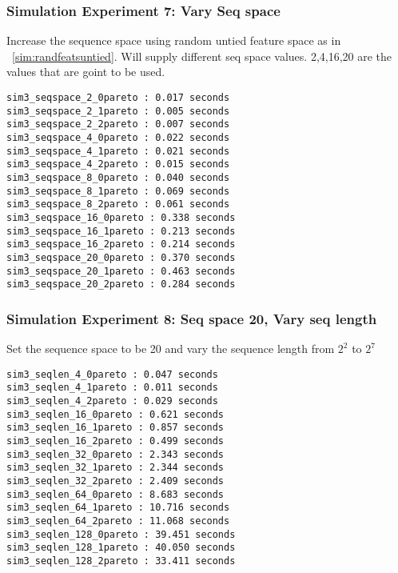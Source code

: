 \documentclass{article}
\begin{document}
\subsubsection{Simulation Experiment 7: Vary Seq space }
\label{sim:seqspace}
Increase the sequence space using random untied feature space as in ~\ref{sim:randfeatsuntied}. Will supply different seq space values. 2,4,16,20 are the values that are goint to be used.
\begin{verbatim}
sim3_seqspace_2_0pareto : 0.017 seconds
sim3_seqspace_2_1pareto : 0.005 seconds
sim3_seqspace_2_2pareto : 0.007 seconds
sim3_seqspace_4_0pareto : 0.022 seconds
sim3_seqspace_4_1pareto : 0.021 seconds
sim3_seqspace_4_2pareto : 0.015 seconds
sim3_seqspace_8_0pareto : 0.040 seconds
sim3_seqspace_8_1pareto : 0.069 seconds
sim3_seqspace_8_2pareto : 0.061 seconds
sim3_seqspace_16_0pareto : 0.338 seconds
sim3_seqspace_16_1pareto : 0.213 seconds
sim3_seqspace_16_2pareto : 0.214 seconds
sim3_seqspace_20_0pareto : 0.370 seconds
sim3_seqspace_20_1pareto : 0.463 seconds
sim3_seqspace_20_2pareto : 0.284 seconds
\end{verbatim}


\subsubsection{Simulation Experiment 8: Seq space 20, Vary seq length}
\label{sim:seqlen}
Set the sequence space to be 20 and vary the sequence length from $2^2$  to $2^7$
\begin{verbatim}
sim3_seqlen_4_0pareto : 0.047 seconds
sim3_seqlen_4_1pareto : 0.011 seconds
sim3_seqlen_4_2pareto : 0.029 seconds
sim3_seqlen_16_0pareto : 0.621 seconds
sim3_seqlen_16_1pareto : 0.857 seconds
sim3_seqlen_16_2pareto : 0.499 seconds
sim3_seqlen_32_0pareto : 2.343 seconds
sim3_seqlen_32_1pareto : 2.344 seconds
sim3_seqlen_32_2pareto : 2.409 seconds
sim3_seqlen_64_0pareto : 8.683 seconds
sim3_seqlen_64_1pareto : 10.716 seconds
sim3_seqlen_64_2pareto : 11.068 seconds
sim3_seqlen_128_0pareto : 39.451 seconds
sim3_seqlen_128_1pareto : 40.050 seconds
sim3_seqlen_128_2pareto : 33.411 seconds
\end{verbatim}
%
\end{document}
